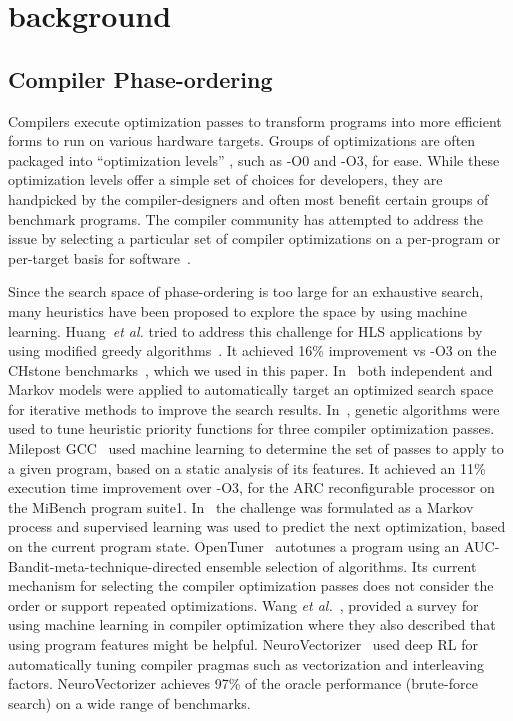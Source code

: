 \vspace{-0.3cm}
\section{background} %
\label{sec:bg}
\subsection{Compiler Phase-ordering}
Compilers execute optimization passes to transform programs into more efficient forms to run on various hardware targets.
Groups of optimizations are often packaged into ``optimization levels'' , such as -O0 and -O3, for ease. 
While these optimization levels offer a simple set of choices for developers, they are handpicked by the compiler-designers and often most benefit certain groups of benchmark programs. 
The compiler community has attempted to address the issue by selecting a particular set of compiler optimizations on a per-program or per-target basis for software~\cite{triantafyllis2003compiler,almagor2004finding,pan2006fast, ansel2014opentuner}.

Since the search space of phase-ordering is too large for an exhaustive search, many heuristics have been proposed to explore the space by using machine learning. 
Huang~\textit{et al.} tried to address this challenge for HLS applications by using modified greedy algorithms~\cite{huang2013effect,huang2015effect}. It achieved 16\% improvement vs -O3 on the CHstone benchmarks~\cite{hara2008chstone}, which we used in this paper.  %
In~\cite{agakov2006using} both independent and Markov models were applied to automatically target an optimized search space for iterative methods to improve the search results.
In~\cite{2003Stephenson}, genetic algorithms were used to tune heuristic priority functions for three compiler optimization passes. 
Milepost GCC~\cite{fursin2011milepost} used machine learning to determine the set of passes to apply to a given program, based on a static analysis of its features. It achieved an 11\% execution time improvement over -O3, for the ARC reconfigurable processor on the MiBench program suite1.
In~\cite{2012Kulkarni} the challenge was formulated as a Markov process and supervised learning was used to predict the next optimization, based on the current program state.
OpenTuner~\cite{ansel2014opentuner} autotunes a program using an AUC-Bandit-meta-technique-directed ensemble selection of algorithms. Its current mechanism for selecting the compiler optimization passes does not consider the order or support repeated optimizations. 
Wang \textit{et al.}~\cite{wang2018}, provided a survey for using machine learning in compiler optimization where they also described that using program features might be helpful. NeuroVectorizer~\cite{haj2019neurovectorizer,hajlearning} used deep RL for automatically tuning compiler pragmas such as vectorization and interleaving factors. NeuroVectorizer achieves 97\% of the oracle performance (brute-force search) on a wide range of benchmarks.

